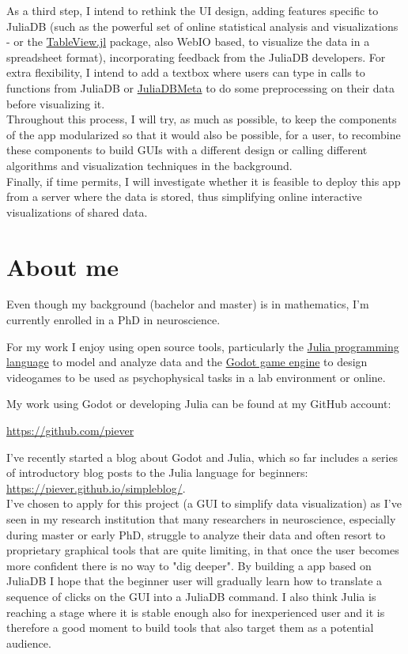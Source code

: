\documentclass[10pt,a4paper]{report}
\begin{document}
As a third step, I intend to rethink the UI design, adding features specific to JuliaDB (such as the powerful set of online statistical analysis and visualizations - or the \href{https://github.com/JuliaComputing/TableView.jl}{TableView.jl} package, also WebIO based, to visualize the data in a spreadsheet format), incorporating feedback from the JuliaDB developers. For extra flexibility, I intend to add a textbox where users can type in calls to functions from JuliaDB or \href{https://github.com/piever/JuliaDBMeta.jl}{JuliaDBMeta} to do some preprocessing on their data before visualizing it.\\

Throughout this process, I will try, as much as possible, to keep the components of the app modularized so that it would also be possible, for a user, to recombine these components to build GUIs with a different design or calling different algorithms and visualization techniques in the background.\\

Finally, if time permits, I will investigate whether it is feasible to deploy this app from a server where the data is stored, thus simplifying online interactive visualizations of shared data.

\section*{About me}

Even though my background (bachelor and master) is in mathematics, I'm currently enrolled in a PhD in neuroscience.

For my work I enjoy using open source tools, particularly the \href{https://julialang.org/}{Julia programming language} to model and analyze data and the \href{https://godotengine.org/}{Godot game engine} to design videogames to be used as psychophysical tasks in a lab environment or online.

My work using Godot or developing Julia can be found at my GitHub account:

\url{https://github.com/piever}

I've recently started a blog about Godot and Julia, which so far includes a series of introductory blog posts to the Julia language for beginners: \url{https://piever.github.io/simpleblog/}. \\

I've chosen to apply for this project (a GUI to simplify data visualization) as I've seen in my research institution that many researchers in neuroscience, especially during master or early PhD, struggle to analyze their data and often resort to proprietary graphical tools that are quite limiting, in that once the user becomes more confident there is no way to "dig deeper". By building a app based on JuliaDB I hope that the beginner user will gradually learn how to translate a sequence of clicks on the GUI into a JuliaDB command. I also think Julia is reaching a stage where it is stable enough also for inexperienced user and it is therefore a good moment to build tools that also target them as a potential audience.
\end{document}
